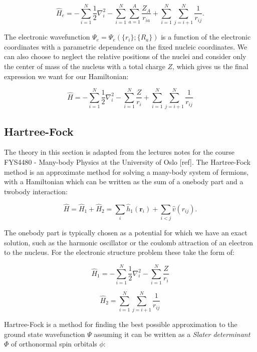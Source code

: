 \begin{equation}
    \hat{H}_e = -\sum_{i=1}^N \frac{1}{2} \nabla_i^2
    -\sum_{i=1}^N \sum_{a=1}^A \frac{Z_A}{r_{ia}}
    +\sum_{i=1}^N \sum_{j=i+1}^N \frac{1}{r_{ij}} .
\end{equation}

The electronic wavefunction $\Psi_e = \Psi_e(\{r_i\}; \{R_a\})$
is a function of the electronic coordinates with a parametric dependence
on the fixed nucleic coordinates. We can also choose to neglect
the relative positions of the nuclei and consider only the
center of mass of the nucleus with a total charge $Z$,
which gives us the final expression we want for our Hamiltonian:

\begin{equation}
    \hat{H} = -\sum_{i=1}^N \frac{1}{2} \nabla_i^2
    - \sum_{i=1}^N \frac{Z}{r_{i}} + \sum_{i=1}^N \sum_{j=i+1}^N
    \frac{1}{r_{ij}}
\end{equation}

\subsection{Hartree-Fock}
The theory in this section is adapted from the lectures notes
for the course FYS4480 - Many-body Physics at the University of Oslo [ref].
The Hartree-Fock method is an approximate method for solving
a many-body system of fermions, with a Hamiltonian 
which can be written as the sum of a onebody part and a twobody interaction:

$$ \hat{H} = \hat{H}_1 + \hat{H}_2 =
\sum_i \hat{h}_1 (\bm{r}_i) + \sum_{i < j} \hat{v}(r_{ij}) . $$

The onebody part is typically chosen as a potential for which
we have an exact solution, such as the harmonic oscillator
or the coulomb attraction of an electron to the nucleus.
For the electronic structure problem these take the form of:

\begin{equation}
    \hat{H}_1 = -\sum_{i=1}^N \frac{1}{2} \nabla_i^2
    - \sum_{i=1}^N \frac{Z}{r_{i}} 
\end{equation}

\begin{equation}
    \hat{H}_2 =
    \sum_{i=1}^N \sum_{j=i+1}^N \frac{1}{r_{ij}}
\end{equation}

Hartree-Fock is a method for finding the best possible
approximation to the ground state wavefunction $\Psi$
assuming it can be written as a \textit{Slater determinant} $\Phi$
of orthonormal spin orbitals $\phi$:

